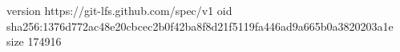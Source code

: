version https://git-lfs.github.com/spec/v1
oid sha256:1376d772ac48e20cbcec2b0f42ba8f8d21f5119fa446ad9a665b0a3820203a1e
size 174916

